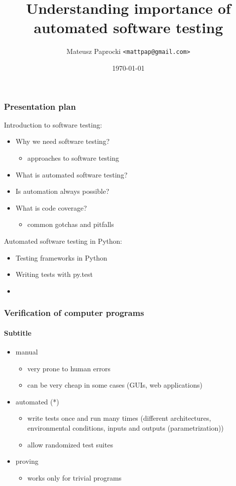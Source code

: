 \documentclass{beamer}
\title{Understanding importance of automated software testing}
\author{Mateusz Paprocki \texttt{<mattpap@gmail.com>}}
\institute{SymPy Development Team}
\date{\today}
\begin{document}

\frame{\titlepage}

\begin{frame}[fragile]
    \frametitle{Presentation plan}

    Introduction to software testing:
    \begin{itemize}

        \item Why we need software testing?
            \begin{itemize}
                \item approaches to software testing
            \end{itemize}
        \item What is automated software testing?
        \item Is automation always possible?
        \item What is code coverage?
            \begin{itemize}
                \item common gotchas and pitfalls
            \end{itemize}
    \end{itemize}

    Automated software testing in Python:
    \begin{itemize}
        \item Testing frameworks in Python
        \item Writing tests with py.test
        \item
    \end{itemize}
\end{frame}

\begin{frame}[fragile]
    \frametitle{Verification of computer programs}
    \framesubtitle{Subtitle}

    \begin{itemize}
        \item manual
            \begin{itemize}
                \item very prone to human errors
                \item can be very cheap in some cases (GUIs, web applications)
            \end{itemize}
        \item automated (*)
            \begin{itemize}
                \item write tests once and run many times (different architectures,
                environmental conditions, inputs and outputs (parametrization))
                \item allow randomized test suites
            \end{itemize}
        \item proving
            \begin{itemize}
                \item works only for trivial programs
            \end{itemize}
    \end{itemize}
\end{frame}
\end{document}
